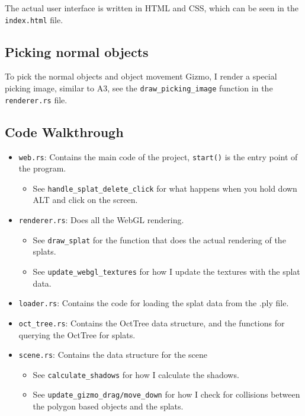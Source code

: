 \documentclass {article}
\begin{document}
The actual user interface is written in HTML and CSS, which can be seen in the \lstinline[style=inlinecode]{index.html} file.

\subsection{Picking normal objects}
To pick the normal objects and object movement Gizmo, I render a special picking image, similar to A3, see the \lstinline[style=inlinecode]{draw_picking_image} function in the \lstinline[style=inlinecode]{renderer.rs} file.


\subsection{Code Walkthrough}

\begin{itemize}
\item \lstinline[style=inlinecode]{web.rs}: Contains the main code of the project, \lstinline[style=inlinecode]{start()} is the entry point of the program.
    \begin{itemize}
        \item See \lstinline[style=inlinecode]{handle_splat_delete_click} for what happens when you hold down ALT and click on the screen.
    \end{itemize}
\item \lstinline[style=inlinecode]{renderer.rs}: Does all the WebGL rendering. 
    \begin{itemize}
        \item See \lstinline[style=inlinecode]{draw_splat} for the function that does the actual rendering of the splats.
        \item See \lstinline[style=inlinecode]{update_webgl_textures} for how I update the textures with the splat data.
    \end{itemize}
\item \lstinline[style=inlinecode]{loader.rs}: Contains the code for loading the splat data from the .ply file.
\item \lstinline[style=inlinecode]{oct_tree.rs}: Contains the OctTree data structure, and the functions for querying the OctTree for splats.
\item \lstinline[style=inlinecode]{scene.rs}: Contains the data structure for the scene
    \begin{itemize}
        \item See \lstinline[style=inlinecode]{calculate_shadows} for how I calculate the shadows.
        \item See \lstinline[style=inlinecode]{update_gizmo_drag/move_down} for how I check for collisions between the polygon based objects and the splats.
    \end{itemize}


\end{itemize}
\end{document}
